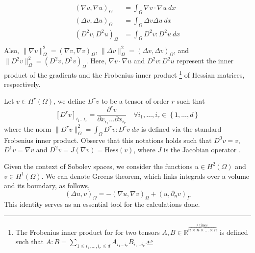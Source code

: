 \documentclass[11pt]{article}
\theoremstyle{remark}
\renewcommand{\le}{\leqslant}
\numberwithin{equation}{section}
\begin{document}
\begin{equation}
\begin{split}
( \nabla v, \nabla u)_{\Omega } & = \int_{\Omega } \nabla v \cdot \nabla u \ dx \\
( \Delta v, \Delta u)_{\Omega } & = \int_{\Omega } \Delta v \Delta u \ dx \\
( D^2 v, D^2 u)_{\Omega } & = \int_{\Omega } D^2 v : D^2 u \ dx \\
\end{split}
\end{equation}
Also, $ \|  \nabla v\|_{  \Omega}^{2} = ( \nabla v, \nabla v)_{\Omega}$, $ \|   \Delta v \|_{\Omega}^{2} = (\Delta v, \Delta v)_{\Omega}$, and $ \| D^2 v \|_{ \Omega}^{2} = (D^2 v, D^2 v)_{\Omega}$.
Here, $\nabla v \cdot \nabla u$ and $D^2 v : D^2 u$ represent the inner product of the gradients and the Frobenius inner product \footnote{
The Frobenius inner product for for two tensors $A, B \in \mathbb{R} ^{\overbrace{n \times n \times \ldots \times n}^{r \text{ times }} } $ is defined such that $ A:B = \sum_{1\le  i_{1}, \ldots, i_{r} \le  d}^{} A_{i_{1} \ldots i_{r}} B_{i_{1}
    \ldots
i_{r}}  $.
} of Hessian matrices, respectively.

Let $v \in H^{r}( \Omega ) $, we define $D^r v$ to be a tensor of order $r$ such that
\begin{equation}
    \label{eq:tensor}
\left[ D^r v \right] _{i_{1} \ldots i_{r}} = \frac{\partial^r v}{\partial x_{ i_{1} } \ldots \partial x_{ i_{r} } } \quad  \forall i_{1}, \ldots, i_{r} \in \left\{ 1,\ldots,d \right\}
\end{equation}
where the norm $\| D^r v\|_{\Omega   }^{ 2 } =
\int_{\Omega }^{} D^r v : D^r v \ dx$ is defined via the standard Frobenius inner product. Observe that this notations holds such that $D^{0} v = v$, $ D^{1} v = \nabla v $ and $D ^{2} v  = J(\nabla v) = \mathrm{Hess}(v)$, where $J$ is the Jacobian operator .

Given the context of Sobolev spaces, we consider the functions $ u \in H^{2}( \Omega )$ and $ v \in H^{1}( \Omega )$. We can denote Greens theorem, which links integrals over a volume and its boundary, as follows,
\[
( \Delta u, v) _{\Omega } = -( \nabla u, \nabla v)_{\Omega } + ( u, \partial _{n}v)_{\Gamma }
\]
This identity serves as an essential tool for the calculations done.
\end{document}
